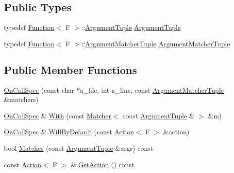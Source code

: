 \subsection*{Public Types}
\begin{DoxyCompactItemize}
\item 
typedef \hyperlink{structtesting_1_1internal_1_1Function}{Function}$<$ F $>$\+::\hyperlink{classtesting_1_1internal_1_1OnCallSpec_a70ffab8b915b7b48a90f5ce256da806f}{Argument\+Tuple} \hyperlink{classtesting_1_1internal_1_1OnCallSpec_a70ffab8b915b7b48a90f5ce256da806f}{Argument\+Tuple}
\item 
typedef \hyperlink{structtesting_1_1internal_1_1Function}{Function}$<$ F $>$\+::\hyperlink{classtesting_1_1internal_1_1OnCallSpec_a3240f159f0a9d8cda208bc256da35074}{Argument\+Matcher\+Tuple} \hyperlink{classtesting_1_1internal_1_1OnCallSpec_a3240f159f0a9d8cda208bc256da35074}{Argument\+Matcher\+Tuple}
\end{DoxyCompactItemize}
\subsection*{Public Member Functions}
\begin{DoxyCompactItemize}
\item 
\hyperlink{classtesting_1_1internal_1_1OnCallSpec_ac7077e8162a10714e463b64a3cc7d054}{On\+Call\+Spec} (const char $\ast$a\+\_\+file, int a\+\_\+line, const \hyperlink{classtesting_1_1internal_1_1OnCallSpec_a3240f159f0a9d8cda208bc256da35074}{Argument\+Matcher\+Tuple} \&matchers)
\item 
\hyperlink{classtesting_1_1internal_1_1OnCallSpec}{On\+Call\+Spec} \& \hyperlink{classtesting_1_1internal_1_1OnCallSpec_a2421cc9ac5c954a3a4c9275c35771bad}{With} (const \hyperlink{classtesting_1_1Matcher}{Matcher}$<$ const \hyperlink{classtesting_1_1internal_1_1OnCallSpec_a70ffab8b915b7b48a90f5ce256da806f}{Argument\+Tuple} \& $>$ \&m)
\item 
\hyperlink{classtesting_1_1internal_1_1OnCallSpec}{On\+Call\+Spec} \& \hyperlink{classtesting_1_1internal_1_1OnCallSpec_a1c6303bf46983f20f4d2a61752fa8663}{Will\+By\+Default} (const \hyperlink{classtesting_1_1Action}{Action}$<$ F $>$ \&action)
\item 
bool \hyperlink{classtesting_1_1internal_1_1OnCallSpec_a98603357e18be6450cd2154853bea3f7}{Matches} (const \hyperlink{classtesting_1_1internal_1_1OnCallSpec_a70ffab8b915b7b48a90f5ce256da806f}{Argument\+Tuple} \&args) const 
\item 
const \hyperlink{classtesting_1_1Action}{Action}$<$ F $>$ \& \hyperlink{classtesting_1_1internal_1_1OnCallSpec_ad560cd3f669be59d1159a962c76ba9b7}{Get\+Action} () const 
\end{DoxyCompactItemize}
